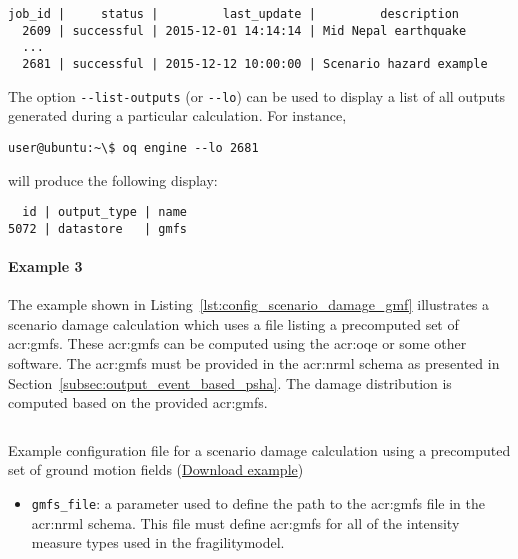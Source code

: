 \begin{verbatim}
job_id |     status |         last_update |         description
  2609 | successful | 2015-12-01 14:14:14 | Mid Nepal earthquake
  ...
  2681 | successful | 2015-12-12 10:00:00 | Scenario hazard example
\end{verbatim}

The option \Verb+--list-outputs+ (or \Verb+--lo+) can be used to display a
list of all outputs generated during a particular calculation. For instance,

\begin{verbatim}
user@ubuntu:~\$ oq engine --lo 2681
\end{verbatim}

will produce the following display:

\begin{verbatim}
  id | output_type | name
5072 | datastore   | gmfs
\end{verbatim}


\paragraph{Example 3}

The example shown in Listing~\ref{lst:config_scenario_damage_gmf} illustrates
a scenario damage calculation which uses a file listing a precomputed set of
\glspl{acr:gmf}. These \glspl{acr:gmf} can be computed using the
\glsdesc{acr:oqe} or some other software. The \glspl{acr:gmf} must be provided
in the \gls{acr:nrml} schema as presented in
Section~\ref{subsec:output_event_based_psha}. The damage distribution is
computed based on the provided \glspl{acr:gmf}.

\begin{listing}[htbp]
  \inputminted[firstline=1,firstnumber=1,fontsize=\footnotesize,frame=single,linenos,bgcolor=lightgray,label=job.ini]{ini}{oqum/risk/verbatim/config_scenario_damage_gmf.ini}
  \caption{Example configuration file for a scenario damage calculation using a precomputed set of ground motion fields (\href{https://raw.githubusercontent.com/GEMScienceTools/oq-engine-docs/master/oqum/risk/verbatim/config_scenario_damage_gmf.ini}{Download example})}
  \label{lst:config_scenario_damage_gmf}
\end{listing}

\begin{itemize}

  \item \Verb+gmfs_file+: a parameter used to define the path
	  to the \glspl{acr:gmf} file in the \gls{acr:nrml} schema. This file must
    define \glspl{acr:gmf} for all of the intensity measure types used in the
    \gls{fragilitymodel}.

\end{itemize}

